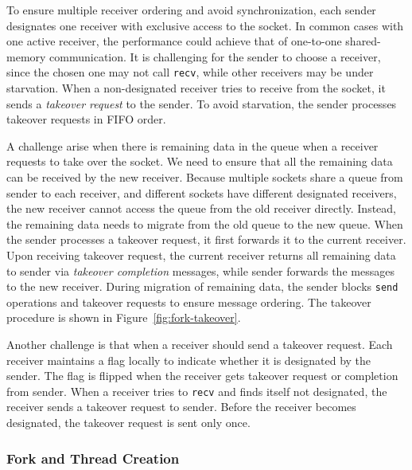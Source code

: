 To ensure multiple receiver ordering and avoid synchronization, each sender designates one receiver with exclusive access to the socket. In common cases with one active receiver, the performance could achieve that of one-to-one shared-memory communication. It is challenging for the sender to choose a receiver, since the chosen one may not call \texttt{recv}, while other receivers may be under starvation. When a non-designated receiver tries to receive from the socket, it sends a \textit{takeover request} to the sender. To avoid starvation, the sender processes takeover requests in FIFO order.

A challenge arise when there is remaining data in the queue when a receiver requests to take over the socket. We need to ensure that all the remaining data can be received by the new receiver. Because multiple sockets share a queue from sender to each receiver, and different sockets have different designated receivers, the new receiver cannot access the queue from the old receiver directly. Instead, the remaining data needs to migrate from the old queue to the new queue. When the sender processes a takeover request, it first forwards it to the current receiver. Upon receiving takeover request, the current receiver returns all remaining data to sender via \textit{takeover completion} messages, while sender forwards the messages to the new receiver. During migration of remaining data, the sender blocks \texttt{send} operations and takeover requests to ensure message ordering. The takeover procedure is shown in Figure~\ref{fig:fork-takeover}.

Another challenge is that when a receiver should send a takeover request. Each receiver maintains a flag locally to indicate whether it is designated by the sender. The flag is flipped when the receiver gets takeover request or completion from sender. When a receiver tries to \texttt{recv} and finds itself not designated, the receiver sends a takeover request to sender. Before the receiver becomes designated, the takeover request is sent only once.


\subsubsection{Fork and Thread Creation}
\label{subsubsec:fork_fork}


